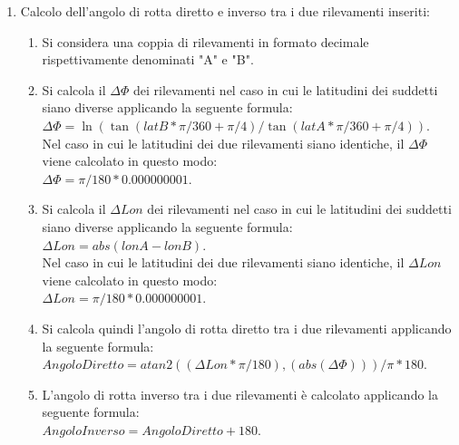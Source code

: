\documentclass{article}
\begin{document}
\begin{enumerate}
	\item  Calcolo dell'angolo di rotta diretto e inverso tra i due rilevamenti inseriti:
	\begin{enumerate}
		\item  Si considera una coppia di rilevamenti in formato decimale rispettivamente denominati "A" e "B".
		\item Si calcola il $\Delta\Phi$ dei rilevamenti nel caso in cui le latitudini dei suddetti siano diverse applicando la seguente formula:\\ $\Delta\Phi = \ln( \tan(latB * \pi / 360 + \pi / 4 ) / \tan(latA * \pi / 360 + \pi / 4 )). $\\
		Nel caso in cui le latitudini dei due rilevamenti siano identiche, il $\Delta\Phi$ viene calcolato in questo modo:\\ $\Delta\Phi = \pi / 180 * 0.000000001.$
		\item Si calcola il $\Delta Lon$ dei rilevamenti nel caso in cui le latitudini dei suddetti siano diverse applicando la seguente formula:\\ $ \Delta Lon = abs(lonA - lonB). $\\
		Nel caso in cui le latitudini dei due rilevamenti siano identiche, il $\Delta Lon$ viene calcolato in questo modo:\\ $\Delta Lon = \pi / 180 * 0.000000001.$
		\item Si calcola quindi l'angolo di rotta diretto tra i due rilevamenti applicando la seguente formula:\\ $ Angolo Diretto = atan2((\Delta Lon * \pi / 180), (abs(\Delta\Phi))) / \pi * 180.$\\
		\item L'angolo di rotta inverso tra i due rilevamenti è calcolato applicando la seguente formula: \\ $ Angolo Inverso = Angolo Diretto + 180.$\\
	\end{enumerate}

\end{enumerate}
\newpage
\end{document}
